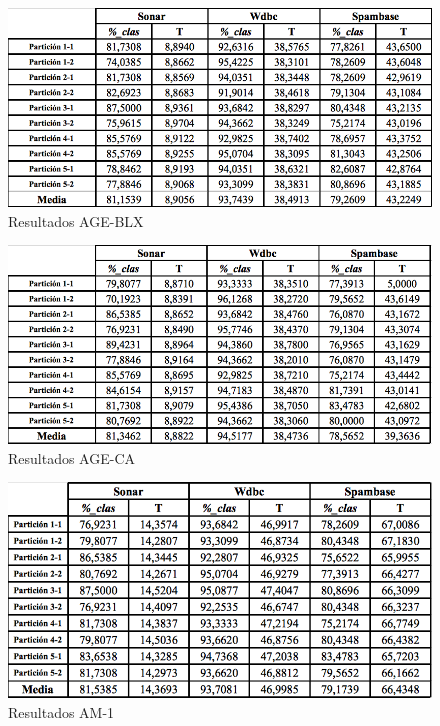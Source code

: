 \begin{figure}[H]
	\centering
	\caption{Resultados AGE-BLX} \label{fig: Resultados AGE-BLX}
	\includegraphics[scale=0.55]{AGE-BLX.png}  
	
\end{figure}

\begin{figure}[H]
	\centering
	\caption{Resultados AGE-CA} \label{fig: Resultados AGE-CA}
	\includegraphics[scale=0.55]{AGE-CA.png}  
	
\end{figure}

\begin{figure}[H]
	\centering
	\caption{Resultados AM-1} \label{fig: Resultados AM-1}
	\includegraphics[scale=0.55]{AM-1.png}  
	
\end{figure}

